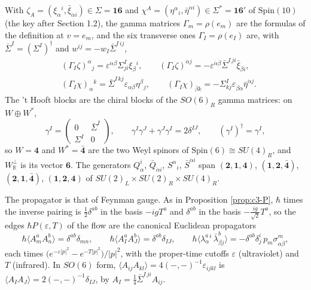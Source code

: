 \begin{remark}
With $\zeta_A=(\xi_\alpha{}^i,\bar\xi_{\dot\alpha i})\in\Sigma=\mathbf{16}$ and $\chi^A=(\eta^\alpha{}_i,\bar\eta^{\dot\alpha i})\in\Sigma^*=\mathbf{16}'$ of $\mathrm{Spin}(10)$ (the key after Section 1.2), the gamma matrices $\Gamma_m=\rho(e_m)$ are the formulas of the definition at $v=e_m$, and the six transverse ones $\Gamma_I=\rho(e_I)$ are, with $\bar\Sigma^I=(\Sigma^I)^\dagger$ and $w^{ij}=-w_I\bar\Sigma^{I\,ij}$,
\[
\begin{aligned}&(\Gamma_I\zeta)^\alpha{}_j=\varepsilon^{\alpha\beta}\Sigma^I_{ji}\xi_\beta{}^i,\qquad (\Gamma_I\zeta)^{\dot\alpha j}=-\varepsilon^{\dot\alpha\dot\beta}\bar\Sigma^{I\,ji}\bar\xi_{\dot\beta i},\\ &(\Gamma_I\chi)_\alpha{}^k=\bar\Sigma^{I\,kj}\varepsilon_{\alpha\beta}\eta^\beta{}_j,\qquad (\Gamma_I\chi)_{\dot\beta k}=-\Sigma^I_{kj}\varepsilon_{\dot\beta\dot\alpha}\bar\eta^{\dot\alpha j}.\end{aligned}
\]
The 't Hooft blocks are the chiral blocks of the $SO(6)_R$ gamma matrices: on $W\oplus W^*$,
\[
\gamma^I=\begin{pmatrix}0&\bar\Sigma^I\\ \Sigma^I&0\end{pmatrix},\qquad \gamma^I\gamma^J+\gamma^J\gamma^I=2\delta^{IJ},\qquad (\gamma^I)^\dagger=\gamma^I,
\]
so $W=\mathbf4$ and $W^*=\bar{\mathbf4}$ are the two Weyl spinors of $\mathrm{Spin}(6)\cong SU(4)_R$, and $W_{\mathbb R}^\perp$ is its vector $\mathbf6$. The generators $Q^i_\alpha$, $\bar Q_{\dot\alpha i}$, $S^\alpha{}_i$, $\bar S^{\dot\alpha i}$ span $(\mathbf2,\mathbf1,\mathbf4)$, $(\mathbf1,\mathbf2,\bar{\mathbf4})$, $(\mathbf2,\mathbf1,\bar{\mathbf4})$, $(\mathbf1,\mathbf2,\mathbf4)$ of $SU(2)_L\times SU(2)_R\times SU(4)_R$.
\end{remark}

\begin{remark}
The propagator is that of Feynman gauge. As in Proposition \ref{prop:c3-P}, $\hbar$ times the inverse pairing is $\tfrac12\delta^{ab}$ in the basis $-igT^a$ and $\delta^{ab}$ in the basis $-\tfrac{ig}{\sqrt2}T^a$, so the edges $\hbar P(\varepsilon,T)$ of the flow are the canonical Euclidean propagators
\[
\hbar\langle A^a_mA^b_n\rangle=\delta^{ab}\delta_{mn},\qquad \hbar\langle A^a_IA^b_J\rangle=\delta^{ab}\delta_{IJ},\qquad \hbar\langle\lambda^a_\alpha{}^i\,\bar\lambda^b_{\dot\beta j}\rangle=-\delta^{ab}\delta^i_j\,p_m\sigma^m_{\alpha\dot\beta},
\]
each times $\big(e^{-\varepsilon|p|^2}-e^{-T|p|^2}\big)/|p|^2$, with the proper-time cutoffs $\varepsilon$ (ultraviolet) and $T$ (infrared). In $SO(6)$ form, $\langle A_{ij}A_{kl}\rangle=4(-,-)^{-1}\varepsilon_{ijkl}$ is $\langle A_IA_J\rangle=2(-,-)^{-1}\delta_{IJ}$, by $A_I=\tfrac14\bar\Sigma^{I\,ji}A_{ij}$.
\end{remark}

